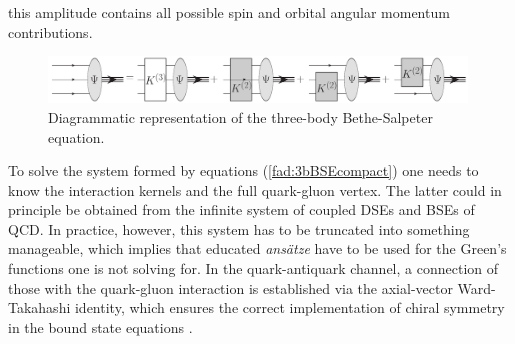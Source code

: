 this amplitude contains all possible spin and orbital angular momentum contributions.
\begin{figure}[h]
 \begin{center}
  \includegraphics[width=0.99\textwidth]{figures/Faddeev}
 \end{center}
 \caption{Diagrammatic representation of the three-body Bethe-Salpeter equation.}\label{fig:faddeev_eq}
\end{figure}
To solve the system formed by equations (\ref{fad:3bBSEcompact}) one needs to know the interaction kernels and the full quark-gluon vertex. The latter could in principle be obtained from the infinite system of coupled DSEs and BSEs of QCD. In practice, however, this system has to be truncated into something manageable, which implies that educated \textit{ans\"atze} have to be used for the Green's functions one is not solving for. 
In the quark-antiquark channel, a connection of those with the quark-gluon interaction is established
via the axial-vector Ward-Takahashi identity, which ensures the correct implementation of chiral 
symmetry in the bound state equations \cite{Munczek:1994zz,Maris:1997hd}. \\
 
